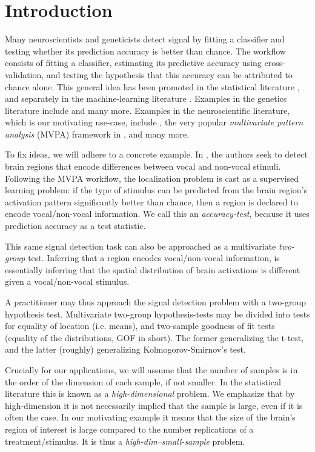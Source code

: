 \documentclass[oupdraft]{bio}
\begin{document}
\section{Introduction}
\label{sec:introduction}

Many neuroscientists and geneticists detect signal by fitting a classifier and testing whether its prediction accuracy is better than chance. 
The workflow consists of fitting a classifier, estimating its predictive accuracy using cross-validation, and testing the hypothesis that this accuracy can be attributed to chance alone. 
This general idea has been promoted in the statistical literature \citep{friedman2003multivariate}, and separately in the machine-learning literature \citep[e.g.][]{eric2008testing,lopez2016revisiting}.
Examples in the genetics literature include \cite{golub_molecular_1999,yu2007two,jiang_calculating_2008} and many more. 
Examples in the neuroscientific literature, which is our motivating use-case, include \cite{golland_permutation_2003,pereira_machine_2009}, the very popular \emph{multivariate pattern analysis} (MVPA) framework in \cite{kriegeskorte_information-based_2006}, and many more. 

To fix ideas, we will adhere to a concrete example.
In \cite{gilron_quantifying_2016}, the authors seek to detect brain regions that encode differences between vocal and non-vocal stimuli. 
Following the MVPA workflow, the localization problem is cast as a supervised learning problem: if the type of stimulus can be predicted from the brain region's activation pattern significantly better than chance, then a region is declared to encode vocal/non-vocal information. 
We call this an \emph{accuracy-test}, because it uses prediction accuracy as a test statistic. 

This same signal detection task can also be approached as a multivariate \emph{two-group} test.
Inferring that a region encodes vocal/non-vocal information, is essentially inferring that the spatial distribution of brain activations is different given a vocal/non-vocal stimulus. 

A practitioner may thus approach the signal detection problem with a two-group hypothesis test.
Multivariate two-group hypothesis-tests may be divided into tests for equality of location (i.e. means), and two-sample goodness of fit tests (equality of the distributions, GOF in short).
The former generalizing the t-test, and the latter (roughly) generalizing Kolmogorov-Smirnov's test.


Crucially for our applications, we will assume that the number of samples is in the order of the dimension of each sample, if not smaller. 
In the statistical literature this is known as a \emph{high-dimensional} problem. 
We emphasize that by high-dimension it is not necessarily implied that the sample is large, even if it is often the case. 
In our motivating example it means that the size of the brain's region of interest is large compared to the number replications of a treatment/stimulus. 
It is thus a \emph{high-dim--small-sample} problem. 
\end{document}
